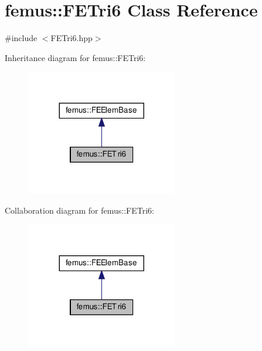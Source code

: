 \hypertarget{classfemus_1_1_f_e_tri6}{}\section{femus\+:\+:F\+E\+Tri6 Class Reference}
\label{classfemus_1_1_f_e_tri6}


{\ttfamily \#include $<$F\+E\+Tri6.\+hpp$>$}



Inheritance diagram for femus\+:\+:F\+E\+Tri6\+:
\nopagebreak
\begin{figure}[H]
\begin{center}
\leavevmode
\includegraphics[width=188pt]{classfemus_1_1_f_e_tri6__inherit__graph}
\end{center}
\end{figure}


Collaboration diagram for femus\+:\+:F\+E\+Tri6\+:
\nopagebreak
\begin{figure}[H]
\begin{center}
\leavevmode
\includegraphics[width=188pt]{classfemus_1_1_f_e_tri6__coll__graph}
\end{center}
\end{figure}
